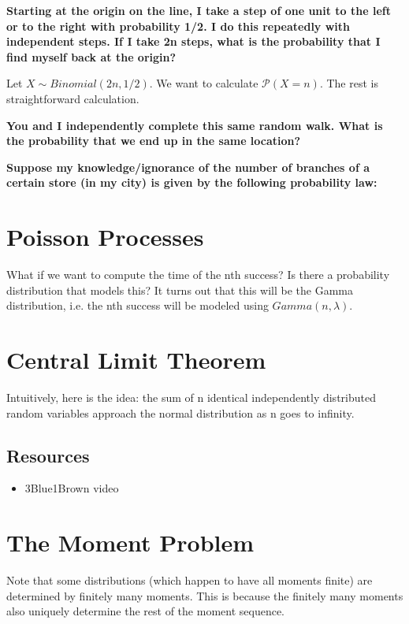 \documentclass{article}
\theoremstyle{definition}
\newcommand{\Prob}{\mathcal{P}}
\begin{document}
\textbf{Starting at the origin on the line, I take a step of one unit to the left or to
the right with probability 1/2. I do this repeatedly with independent steps. If I
take 2n steps, what is the probability that I find myself back at the origin?}

Let $X \sim Binomial(2n,1/2)$. We want to calculate $\Prob(X = n)$. The rest is
straightforward calculation.

\textbf{You and I independently complete this same random walk. What is the
probability that we end up in the same location?}


\textbf{Suppose my knowledge/ignorance of the number of branches of a certain store (in
my city) is given by the following probability law: }

\newpage

\section{Poisson Processes}

What if we want to compute the time of the nth success? Is there a probability distribution that models this?
It turns out that this will be the Gamma distribution, i.e. the nth success will be modeled using $Gamma(n,\lambda)$.

\newpage

\section{Central Limit Theorem}

Intuitively, here is the idea: the sum of n identical independently distributed 
random variables approach the normal distribution as n goes to infinity.

\subsection{Resources}

\begin{itemize}
    \item 3Blue1Brown video
\end{itemize}

\newpage

\section{The Moment Problem}



Note that some distributions (which happen to have all moments finite) are determined
by finitely many moments. This is because the finitely many moments also uniquely determine
the rest of the moment sequence.
\end{document}
